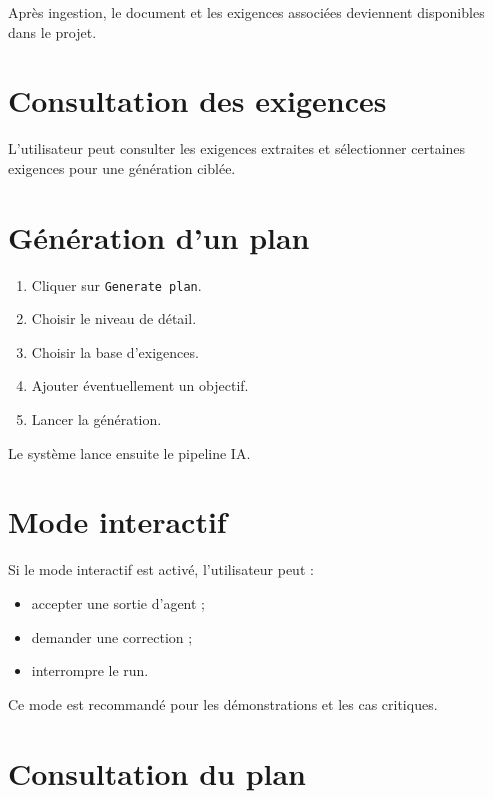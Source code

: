 \documentclass[
  french,
]{report}
\providecommand{\tightlist}{%
  \setlength{\itemsep}{0pt}\setlength{\parskip}{0pt}}
\begin{document}
Après ingestion, le document et les exigences associées deviennent
disponibles dans le projet.

\section{Consultation des
exigences}\label{consultation-des-exigences}

L'utilisateur peut consulter les exigences extraites et sélectionner
certaines exigences pour une génération ciblée.

\section{Génération d'un plan}\label{guxe9nuxe9ration-dun-plan}

\begin{enumerate}
\def\labelenumi{\arabic{enumi}.}
\tightlist
\item
  Cliquer sur \texttt{Generate\ plan}.
\item
  Choisir le niveau de détail.
\item
  Choisir la base d'exigences.
\item
  Ajouter éventuellement un objectif.
\item
  Lancer la génération.
\end{enumerate}

Le système lance ensuite le pipeline IA.

\section{Mode interactif}\label{mode-interactif-1}

Si le mode interactif est activé, l'utilisateur peut :

\begin{itemize}
\tightlist
\item
  accepter une sortie d'agent ;
\item
  demander une correction ;
\item
  interrompre le run.
\end{itemize}

Ce mode est recommandé pour les démonstrations et les cas critiques.

\section{Consultation du plan}\label{consultation-du-plan}
\end{document}
